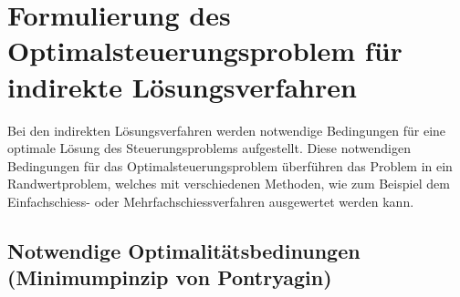 \chapter{Formulierung des Optimalsteuerungsproblem für indirekte Lösungsverfahren}

Bei den indirekten Lösungsverfahren werden notwendige Bedingungen für eine optimale Lösung des Steuerungsproblems aufgestellt. Diese notwendigen Bedingungen für das Optimalsteuerungsproblem überführen das Problem in ein  Randwertproblem, welches mit verschiedenen Methoden, wie zum Beispiel dem Einfachschiess- oder Mehrfachschiessverfahren ausgewertet werden kann.

\section{Notwendige Optimalitätsbedinungen (Minimumpinzip von Pontryagin)}
%
